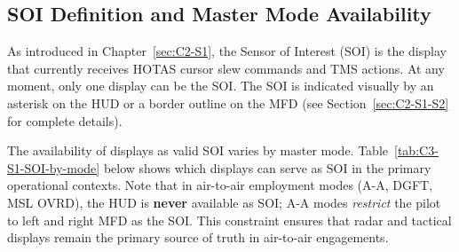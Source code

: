 \documentclass[11pt, a4paper, twoside]{report}
\begin{document}
\subsection{SOI Definition and Master Mode Availability}
\label{sec:C3-S1-S1}

As introduced in Chapter~\ref{sec:C2-S1}, the Sensor of Interest (SOI) is the display that currently receives HOTAS cursor slew commands and TMS actions. At any moment, only one display can be the SOI. The SOI is indicated visually by an asterisk on the HUD or a border outline on the MFD (see Section~\ref{sec:C2-S1-S2} for complete details).

The availability of displays as valid SOI varies by master mode. Table~\ref{tab:C3-S1-SOI-by-mode} below shows which displays can serve as SOI in the primary operational contexts. Note that in air-to-air employment modes (A-A, DGFT, MSL OVRD), the HUD is \textbf{never} available as SOI; A-A modes \textit{restrict} the pilot to left and right MFD as the SOI. This constraint ensures that radar and tactical displays remain the primary source of truth in air-to-air engagements.

\small
\renewcommand{\arraystretch}{1.2}
\end{document}
